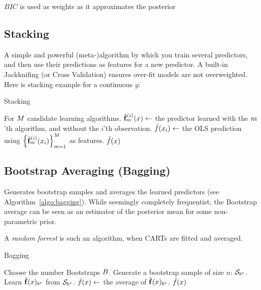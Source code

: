 $BIC$ is used as weights as it approximates the posterior 



\subsection{Stacking}
A simple and powerful (meta-)algorithm by which you train several predictors, and then use their predictions as features for a new predictor. 
A built-in Jackknifing (or Cross Validation) ensures over-fit models are not overweighted.
Here is  stacking example for a continuous $y$:

\begin{algorithm}[H]
\caption{Stacking}
\label{algo:stacking}
\begin{algorithmic}
\State For $M$ candidate learning algorithms.
		\State $\hat{\mathbf{f}}^{(i)}_m(x) \gets$ the predictor learned with the $m$'th algorithm, and without the $i$'th observation.
	\EndFor
\EndFor
\State $\bar{f}(x_i) \gets$ the OLS prediction using $\left\{  \hat{\mathbf{f}}^{(i)}_m(x_i) \right\}_{m=1}^M$ as features. 
\State \Return $\bar{f}(x)$
\end{algorithmic}
\end{algorithm}



\subsection{Bootstrap Averaging (Bagging)}

Generates bootstrap samples and averages the learned predictors (see Algorithm~\ref{algo:bagging}). 
While seemingly completely frequentist, the Bootstrap average can be seen as an estimator of the posterior mean for some non-parametric prior.

A \emph{random forrest} is such an algorithm, when CARTs are fitted and averaged. 


\begin{algorithm}[H]
\caption{Bagging}
\label{algo:bagging}
\begin{algorithmic}
\State Choose the number Bootstraps $B$.
	\State Generate a bootstrap sample of size $n$: $\mathcal{S}_{b^*}$.
	\State Learn $\hat{\mathbf{f}}(x)_{{b^*}}$ from $\mathcal{S}_{b^*}$.
\EndFor
\State $\bar{f}(x) \gets$ the average of $\hat{\mathbf{f}}(x)_{{b^*}}$.
\State \Return $\bar{f}(x)$
\end{algorithmic}
\end{algorithm}



